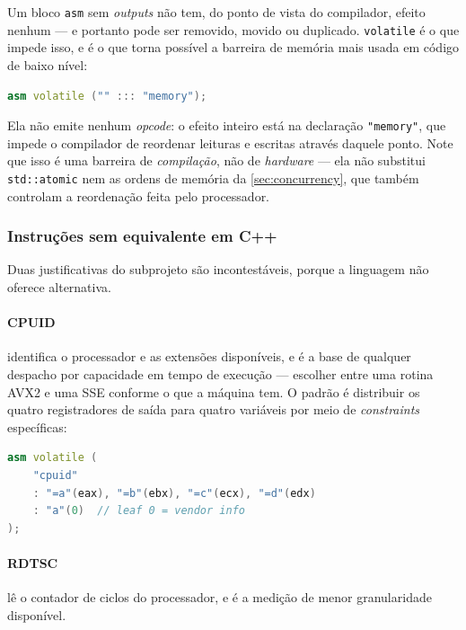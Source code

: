 Um bloco \texttt{asm} sem \emph{outputs} não tem, do ponto de vista do
compilador, efeito nenhum --- e portanto pode ser removido, movido ou duplicado.
\texttt{volatile} é o que impede isso, e é o que torna possível a barreira de
memória mais usada em código de baixo nível:

\begin{lstlisting}[style=bt, language=C++,
    caption={A barreira que não gera instrução alguma.}]
asm volatile ("" ::: "memory");
\end{lstlisting}

Ela não emite nenhum \emph{opcode}: o efeito inteiro está na declaração
\texttt{"memory"}, que impede o compilador de reordenar leituras e escritas
através daquele ponto. Note que isso é uma barreira de \emph{compilação}, não de
\emph{hardware} --- ela não substitui \texttt{std::atomic} nem as ordens de
memória da \cref{sec:concurrency}, que também controlam a reordenação feita pelo
processador.

\subsubsection{Instruções sem equivalente em C++}

Duas justificativas do subprojeto são incontestáveis, porque a linguagem não
oferece alternativa.

\paragraph{CPUID} identifica o processador e as extensões disponíveis, e é a
base de qualquer despacho por capacidade em tempo de execução --- escolher entre
uma rotina AVX2 e uma SSE conforme o que a máquina tem. O padrão é distribuir os
quatro registradores de saída para quatro variáveis por meio de
\emph{constraints} específicas:

\begin{lstlisting}[style=bt, language=C++,
    caption={Cada \emph{constraint} nomeia um registrador exato.}]
asm volatile (
    "cpuid"
    : "=a"(eax), "=b"(ebx), "=c"(ecx), "=d"(edx)
    : "a"(0)  // leaf 0 = vendor info
);
\end{lstlisting}

\paragraph{RDTSC} lê o contador de ciclos do processador, e é a medição de menor
granularidade disponível.

